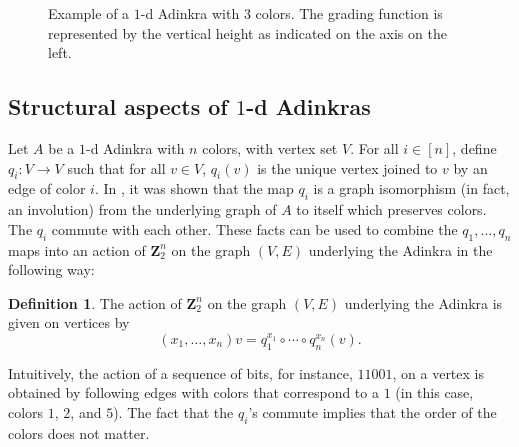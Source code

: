 \documentclass[12pt,twoside,singlespace]{article}
\numberwithin{equation}{section}
\theoremstyle{definition}
\newtheorem{definition}[equation]{Definition}
\newcommand{\ZZ}{\mathbf{Z}}
\begin{document}
\begin{figure}
\begin{center}
\caption{Example of a $1$-d Adinkra with $3$ colors.  The grading function is represented by the vertical height as indicated on the axis on the left.
\label{fig:1d-examples}}
\end{center}
\end{figure}


\subsection{Structural aspects of $1$-d Adinkras}
\label{sec:code}

 Let $A$ be a $1$-d Adinkra with $n$ colors, with vertex set $V$.  For all $i\in [n]$, define $q_i:V\to V$ such that for all $v\in V$, $q_i(v)$ is the unique vertex joined to $v$ by an edge of color $i$.  In \cite{d2l:omni}, it was shown that the map $q_i$ is a graph isomorphism (in fact, an involution) from the underlying graph of $A$ to itself which preserves colors. The $q_i$ commute with each other. These facts can be used to combine the $q_1,\ldots, q_n$ maps into an action of $\ZZ_2^n$ on the graph $(V,E)$ underlying the Adinkra in the following way:
\begin{definition}
The action of $\ZZ_2^n$ on the graph $(V,E)$ underlying the Adinkra is given on vertices by
\[(x_1,\ldots,x_n)v=q_1^{x_1}\circ\cdots\circ q_n^{x_n}(v).\]
\end{definition}

Intuitively, the action of a sequence of bits, for instance, $11001$, on a vertex is obtained by following edges with colors that correspond to a $1$ (in this case, colors $1$, $2$, and $5$).  The fact that the $q_i$'s commute implies that the order of the colors does not matter.
\end{document}
